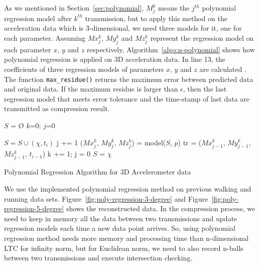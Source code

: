 As we mentioned in Section~\ref{sec:polynomial}, $M_{j}^{k}$ means the $j^{th}$
polynomial regression model after $k^{th}$ transmission, but to apply this
method on the acceleration data which is 3-dimensional, we need three models for
it, one for each parameter. Assuming $Mx_{j}^{k}$, $My_{j}^{k}$ and
$Mz_{j}^{k}$ represent the regression model on each parameter $x$, $y$ and $z$
respectively, Algorithm~\ref{algo:n-polynomial} shows how polynomial regression
is applied on 3D acceleration data. In line 13, the coefficients of three
regression models of parameters $x$, $y$ and $z$ are calculated . The function
\texttt{max\_residue()} returns the maximum error between predicted data and
original data. If the maximum residue is larger than $\epsilon$, then the last
regression model that meets error tolerance and the time-stamp of last data are
transmitted as compression result.
\begin{algorithm}
\begin{algorithmic}[1]
\Input
\EndInput
\Output
\EndOutput
\State $S$ = $\text{\O}$
\State $k$=0; $j$=0

    \State $S = S \cup (\chi, t_i)$
        \State j += 1
        \State ($Mx_{j}^{k}$, $My_{j}^{k}$, $Mz_{j}^{k}$) = model($S$, $p$)    
            \State tr = ($Mx_{j-1}^{k}$, $My_{j-1}^{k}$, $Mz_{j-1}^{k}$, $t_{i-1}$)
            \State k += 1; j = 0
            \State $S$ = $\chi$
        \EndIf
    \EndIf
\EndWhile

\end{algorithmic}
\caption{Polynomial Regression Algorithm for 3D Accelerometer data}
\label{algo:n-polynomial}
\end{algorithm}

We use the implemented polynomial regression method on previous walking and running
data sets. Figure~\ref{fig:poly-regression-3-degree} and
Figure~\ref{fig:poly-regression-5-degree} shows the reconstructed data. In the
compression process, we need to keep in memory all the data between two
transmissions and update regression models each time a new data point arrives. So,
using polynomial regression method needs more memory and processing time than
n-dimensional LTC for infinity norm, but for Euclidean norm, we need to also
record n-balls between two transmissions and execute intersection checking. 

